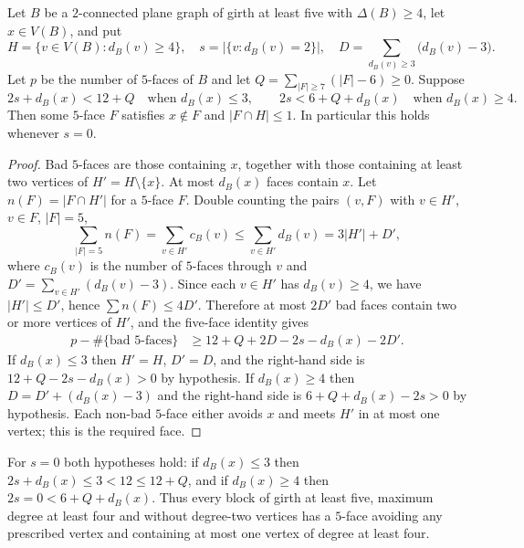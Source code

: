 
\newcommand{\Qfive}{\mathcal Q}

\begin{lemma}\label{lem:one-big}
Let $B$ be a $2$-connected plane graph of girth at least five with
$\Delta(B)\ge4$, let $x\in V(B)$, and put
\[
 H=\{v\in V(B):d_B(v)\ge4\},\quad
 s=|\{v:d_B(v)=2\}|,\quad
 D=\sum_{d_B(v)\ge3}\bigl(d_B(v)-3\bigr).
\]
Let $p$ be the number of $5$-faces of $B$ and let
$Q=\sum_{|F|\ge7}(|F|-6)\ge0$.  Suppose
\[
 2s+d_B(x)<12+Q \quad\text{when } d_B(x)\le3,
 \qquad
 2s<6+Q+d_B(x) \quad\text{when } d_B(x)\ge4 .
\]
Then some $5$-face $F$ satisfies $x\notin F$ and $|F\cap H|\le1$.
In particular this holds whenever $s=0$.
\end{lemma}

\begin{proof}
Bad $5$-faces are those containing $x$, together with those containing at
least two vertices of $H'=H\setminus\{x\}$.  At most $d_B(x)$ faces contain
$x$.  Let $n(F)=|F\cap H'|$ for a $5$-face $F$.  Double counting the pairs
$(v,F)$ with $v\in H'$, $v\in F$, $|F|=5$,
\[
 \sum_{|F|=5} n(F)=\sum_{v\in H'} c_B(v)\le\sum_{v\in H'}d_B(v)=3|H'|+D',
\]
where $c_B(v)$ is the number of $5$-faces through $v$ and
$D'=\sum_{v\in H'}(d_B(v)-3)$.  Since each $v\in H'$ has $d_B(v)\ge4$, we have
$|H'|\le D'$, hence $\sum n(F)\le4D'$.  Therefore at most $2D'$ bad faces
contain two or more vertices of $H'$, and the five-face identity gives
\begin{align*}
p-\#\{\text{bad }5\text{-faces}\}
&\ge 12+Q+2D-2s-d_B(x)-2D' .
\end{align*}
If $d_B(x)\le3$ then $H'=H$, $D'=D$, and the right-hand side is
$12+Q-2s-d_B(x)>0$ by hypothesis.  If $d_B(x)\ge4$ then
$D=D'+(d_B(x)-3)$ and the right-hand side is
$6+Q+d_B(x)-2s>0$ by hypothesis.
Each non-bad $5$-face either avoids $x$ and meets $H'$ in at most one vertex;
this is the required face.
\end{proof}

\begin{remark}
For $s=0$ both hypotheses hold: if $d_B(x)\le3$ then
$2s+d_B(x)\le3<12\le12+Q$, and if $d_B(x)\ge4$ then $2s=0<6+Q+d_B(x)$.
Thus every block of girth at least five, maximum degree at least four and
without degree-two vertices has a $5$-face avoiding any prescribed vertex and
containing at most one vertex of degree at least four.
\end{remark}
